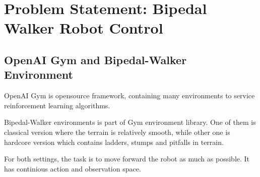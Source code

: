 \section{Problem Statement: Bipedal Walker Robot Control}
\label{sec:problem_statement}

\subsection{OpenAI Gym and Bipedal-Walker Environment}
\label{gym_bipedal}
OpenAI Gym \cite{brockman_openai_2016} is opensource framework, containing many environments to service reinforcement learning algorithms. 

Bipedal-Walker environments \cite{noauthor_bipedalwalker-v2_2021} \cite{noauthor_bipedalwalkerhardcore-v2_2021} is part of Gym environment library. One of them is classical version where the terrain is relatively smooth, while other one is hardcore version which contains ladders, stumps and pitfalls in terrain.

For both settings, the task is to move forward the robot as much as possible. It has continious action and observation space. 

